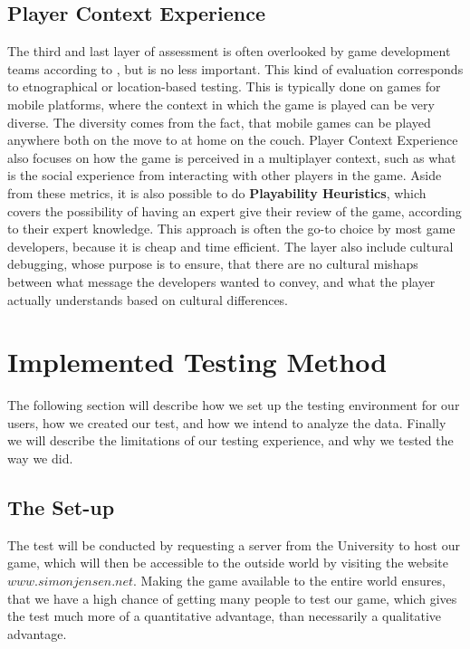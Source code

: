 \subsection{Player Context Experience}
The third and last layer of assessment is often overlooked by game development teams according to \cite{gxmethod}, but is no less important.
This kind of evaluation corresponds to etnographical or location-based testing.
This is typically done on games for mobile platforms, where the context in which the game is played can be very diverse.
The diversity comes from the fact, that mobile games can be played anywhere both on the move to at home on the couch.
Player Context Experience also focuses on how the game is perceived in a multiplayer context, such as what is the social experience from interacting with other players in the game.
Aside from these metrics, it is also possible to do \textbf{Playability Heuristics}, which covers the possibility of having an expert give their review of the game, according to their expert knowledge.
This approach is often the go-to choice by most game developers, because it is cheap and time efficient\cite{gxmethod}.
The layer also include cultural debugging, whose purpose is to ensure, that there are no cultural mishaps between what message the developers wanted to convey, and what the player actually understands based on cultural differences.

\section{Implemented Testing Method}
\label{sec:test_method}

The following section will describe how we set up the testing environment for our users, how we created our test, and how we intend to analyze the data. Finally we will describe the limitations of our testing experience, and why we tested the way we did.

\subsection{The Set-up}

The test will be conducted by requesting a server from the University to host our game, which will then be accessible to the outside world by visiting the website $www.simonjensen.net$.
Making the game available to the entire world ensures, that we have a high chance of getting many people to test our game, which gives the test much more of a quantitative advantage, than necessarily a qualitative advantage.

